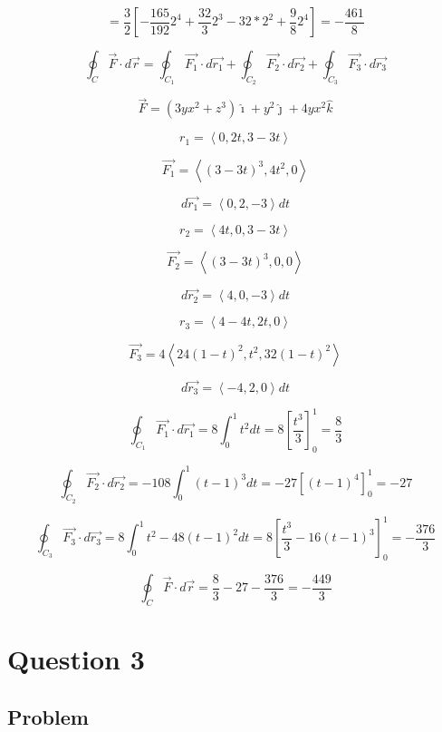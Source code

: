 \documentclass[12pt]{article}
\begin{document}
\[
    = \frac{3}{2} \left[ -\frac{165}{192} 2^4 + \frac{32}{3} 2^3 - 32*2^2 + \frac{9}{8} 2^4 \right]
    = -\frac{461}{8}
\]

\[
    \oint_C \vec{F} \cdot d \vec{r}
    = \oint_{C_1} \overrightarrow{F_1} \cdot d \vec{r_1}
    + \oint_{C_2} \overrightarrow{F_2} \cdot d \vec{r_2}
    + \oint_{C_3} \overrightarrow{F_3} \cdot d \vec{r_3}
\]

\[
    \vec{F}=\left(3 y x^2+z^3\right) \hat{\imath}+y^2 \hat{\jmath}+4 y x^2 \hat{k}
\]

\[
    r_1 = \left\langle0, 2t, 3-3t\right\rangle
\]

\[
    \overrightarrow{F_1} =
    \left\langle {(3-3t)}^3, 4t^2, 0\right\rangle
\]

\[
    d \vec{r_1} = \left\langle0, 2, -3\right\rangle dt
\]

\[
    r_2 = \left\langle4t, 0, 3-3t\right\rangle
\]

\[
    \overrightarrow{F_2} =
    \left\langle {(3-3t)}^3, 0, 0\right\rangle
\]

\[
    d \vec{r_2} = \left\langle4, 0, -3\right\rangle dt
\]

\[
    r_3 = \left\langle4-4t, 2t, 0\right\rangle
\]

\[
    \overrightarrow{F_3} =
    4\left\langle 24{(1-t)}^2, t^2, 32{(1-t)}^2\right\rangle
\]

\[
    d \vec{r_3} = \left\langle-4, 2, 0\right\rangle dt
\]

\[
    \oint_{C_1} \overrightarrow{F_1} \cdot d \vec{r_1}
    = 8 \int_0^1 t^2 dt
    = 8 {\left[ \frac{t^3}{3} \right]}_0^1
    = \frac{8}{3}
\]

\[
    \oint_{C_2} \overrightarrow{F_2} \cdot d \vec{r_2}
    = - 108 \int_0^1 {(t-1)}^3 dt
    = - 27 {\left[ {(t-1)}^4 \right]}_0^1
    = - 27
\]

\[
    \oint_{C_3} \overrightarrow{F_3} \cdot d \vec{r_3}
    = 8 \int_0^1 t^2 - 48 {(t-1)}^2 dt
    = 8 {\left[ \frac{t^3}{3} - 16 {(t-1)}^3 \right]}_0^1
    = -\frac{376}{3}
\]

\[
    \oint_C \vec{F} \cdot d \vec{r}
    = \frac{8}{3} - 27 - \frac{376}{3}
    = -\frac{449}{3}
\]


\newpage
\section{Question 3}

\subsection{Problem}
\end{document}

